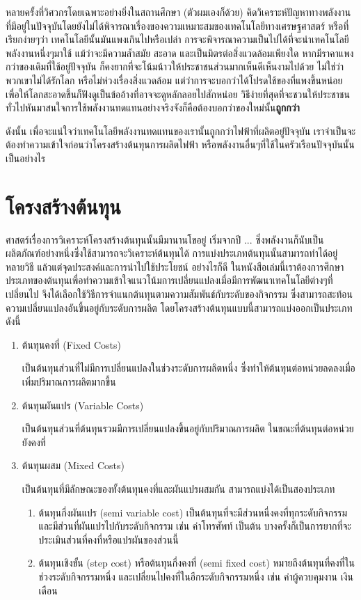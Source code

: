 \message{ !name(solar.tex)}\documentclass[
a4paper,
svgnames,
openany,
justified,
]{tufte-book}
\begin{document}
หลายครั้งที่วิศวกรโดยเฉพาะอย่างยิ่งในสถานศึกษา (ตัวผมเองก็ด้วย) คิดวิเคราะห์ปัญหาทางพลังงานที่มีอยู่ในปัจจุบันโดยยังไม่ได้พิจารณาเรื่องของความเหมาะสมของเทคโนโลยีทางเศรษฐศาสตร์ หรือที่เรียกง่ายๆว่า เทคโนโลยีนั้นมันแพงเกินไปหรือเปล่า การจะพิจารณาความเป็นไปได้ที่จะนำเทคโนโลยีพลังงานหนึ่งๆมาใช้ แม้ว่าจะมีความล้ำสมัย สะอาด และเป็นมิตรต่อสิ่งแวดล้อมเพียงใด หากมีราคาแพงกว่าของเดิมที่ใช้อยู่ปัจจุบัน ก็คงยากที่จะโน้มน้าวให้ประชาชนส่วนมากเห็นดีเห็นงามไปด้วย ไม่ใช่ว่าพวกเขาไม่ได้รักโลก หรือไม่ห่วงเรื่องสิ่งแวดล้อม แต่ว่าการจะบอกว่าได้โปรดใช้ของที่แพงขึ้นหน่อยเพื่อให้โลกสะอาดขึ้นก็ฟังดูเป็นข้ออ้างที่อาจจะดูหลักลอยไปสักหน่อย วิธีง่ายที่สุดที่จะชวนให้ประชาชนทั่วไปหันมาสนใจการใช้พลังงานทดแทนอย่างจริงจังก็คือต้องบอกว่าของใหม่นั้น\textbf{ถูกกว่า}

ดังนั้น เพื่อจะแน่ใจว่าเทคโนโลยีพลังงานทดแทนของเรานั้นถูกกว่าไฟฟ้าที่ผลิตอยู่ปัจจุบัน เราจำเป็นจะต้องทำความเข้าใจก่อนว่าโครงสร้างต้นทุนการผลิตไฟฟ้า หรือพลังงานอื่นๆที่ใช้ในครัวเรือนปัจจุบันนั้นเป็นอย่างไร

\section{โครงสร้างต้นทุน}

ศาสตร์เรื่องการวิเคราะห์โครงสร้างต้นทุนนั้นมีมานานโขอยู่ เริ่มจากปี ... ซึ่งพลังงานก็นับเป็นผลิตภัณฑ์อย่างหนึ่งซึ่งใช้สามารถจะวิเคราะห์ต้นทุนได้ การแบ่งประเภทต้นทุนนั้นสามารถทำได้อยู่หลายวิธี แล้วแต่จุดประสงค์และการนำไปใช้ประโยชน์ อย่างไรก็ดี ในหนังสือเล่มนี้เราต้องการศึกษาประเภทของต้นทุนเพื่อทำความเข้าใจแนวโน้มการเปลี่ยนแปลงเมื่อมีการพัฒนาเทคโนโลยีต่างๆที่เปลี่ยนไป จึงได้เลือกใช้วิธีการจำแนกต้นทุนตามความสัมพันธ์กับระดับของกิจกรรม ซึ่งสามารถสะท้อนความเปลี่ยนแปลงอันขึ้นอยู่กับระดับการผลิต โดยโครงสร้างต้นทุนแบบนี้สามารถแบ่งออกเป็นประเภทดังนี้

\begin{enumerate}
\item ต้นทุนคงที่ (Fixed Costs)

  เป็นต้นทุนส่วนที่ไม่มีการเปลี่ยนแปลงในช่วงระดับการผลิตหนึ่ง ซึ่งทำให้ต้นทุนต่อหน่วยลดลงเมื่อเพิ่มปริมาณการผลิตมากขึ้น
\item ต้นทุนผันแปร (Variable Costs)

  เป็นต้นทุนส่วนที่ต้นทุนรวมมีการเปลี่ยนแปลงขึ้นอยู่กับปริมาณการผลิต ในขณะที่ต้นทุนต่อหน่วยยังคงที่

\item ต้นทุนผสม (Mixed Costs)

  เป็นต้นทุนที่มีลักษณะของทั้งต้นทุนคงที่และผันแปรผสมกัน สามารถแบ่งได้เป็นสองประเภท

  \begin{enumerate}
  \item ต้นทุนกึ่งผันแปร (semi variable cost) เป็นต้นทุนที่จะมีส่วนหนึ่งคงที่ทุกระดับกิจกรรม และมีส่วนที่ผันแปรไปกับระดับกิจกรรม เช่น ค่าโทรศัพท์ เป็นต้น บางครั้งก็เป็นการยากที่จะประเมินส่วนที่คงที่หรือแปรผันของส่วนนี้
  \item ต้นทุนเชิงขั้น (step cost) หรือต้นทุนกึ่งคงที่ (semi fixed cost) หมายถึงต้นทุนที่คงที่ในช่วงระดับกิจกรรมหนึ่ง และเปลี่ยนไปคงที่ในอีกระดับกิจกรรมหนึ่ง เช่น ค่าผู้ควบคุมงาน เงินเดือน
  \end{enumerate}
\end{enumerate}
\end{document}
